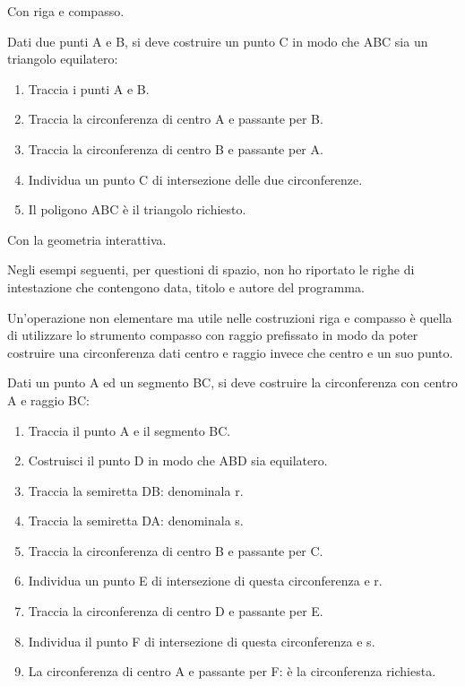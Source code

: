 Con riga e compasso.

\begin{procedura}\label{proc:fonda_equilatero}
  Dati due punti A e B, si deve costruire un punto C in modo che ABC sia un 
triangolo equilatero:
  \begin{enumerate} [nosep]
    \item 
    Traccia i punti A e B.
    \item 
    Traccia la circonferenza di centro A e passante per B.
    \item 
    Traccia la circonferenza di centro B e passante per A.
    \item 
    Individua un punto C di intersezione delle due circonferenze.
    \item 
    Il poligono ABC è il triangolo richiesto.    
  \end{enumerate}
\end{procedura}

\ifcoding
Con la geometria interattiva.
\begin{osservazione}
 Negli esempi seguenti, per questioni di spazio, non ho riportato le righe di 
intestazione che contengono data, titolo e autore del programma.
\end{osservazione}

\fi

Un'operazione non elementare ma utile nelle costruzioni riga e compasso è 
quella di utilizzare lo strumento compasso con raggio prefissato in modo da 
poter costruire una circonferenza dati centro e raggio invece che centro e un 
suo punto.

\begin{procedura}\label{proc:fonda_comp_rig}
  Dati un punto A ed un segmento BC, si deve costruire la circonferenza con 
centro A e raggio BC:
  \begin{enumerate} [nosep]
    \item 
    Traccia il punto A e il segmento BC.
    \item 
    Costruisci il punto D in modo che ABD sia equilatero.
    \item 
    Traccia la semiretta DB: denominala r.
    \item 
    Traccia la semiretta DA: denominala s.
    \item 
    Traccia la circonferenza di centro B e passante per C.
    \item 
    Individua un punto E di intersezione di questa circonferenza e r.
    \item 
    Traccia la circonferenza di centro D e passante per E.
    \item 
    Individua il punto F di intersezione di questa circonferenza e s.
    \item 
    La circonferenza di centro A e passante per F: è la circonferenza 
richiesta.    
  \end{enumerate}
\end{procedura}

